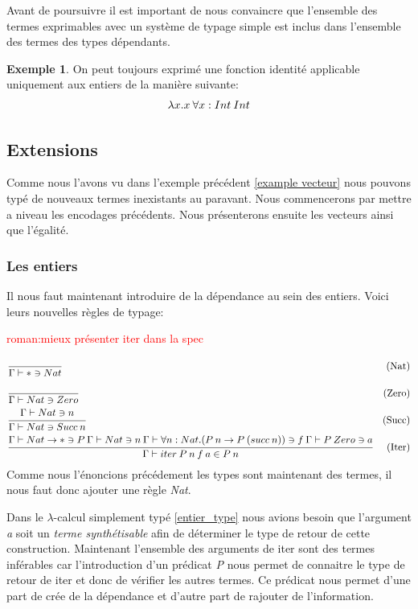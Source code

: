 \documentclass {article}
\theoremstyle{definition}
\newtheorem{example}{Exemple}
\theoremstyle{remark}
\newcommand{\todo}[1]{\textcolor{red}{#1}}
\begin{document}
Avant de poursuivre il est important de nous convaincre que l'ensemble des termes exprimables avec un système 
de typage simple est inclus dans l'ensemble des termes des types dépendants.
\begin{example}
  On peut toujours exprimé une fonction identité applicable uniquement aux entiers de la manière suivante:
  \begin{align*}
    &\lambda x. x\:\forall x:Int\:Int \\
  \end{align*}
\end{example}

\subsection{Extensions}

Comme nous l'avons vu dans l'exemple précédent \ref{example vecteur} nous pouvons typé de nouveaux termes inexistants au paravant.
Nous commencerons par mettre a niveau les encodages précédents. Nous présenterons ensuite les vecteurs ainsi que l'égalité.

\subsubsection{Les entiers}

Il nous faut maintenant introduire de la dépendance au sein des entiers. 
Voici leurs nouvelles règles de typage:

\todo{roman:mieux présenter iter dans la spec} 
\begin{align*}
  &\cfrac{}
  {\Gamma\vdash * \ni Nat}&\mbox{(Nat)} \\
  &\cfrac{}
  {\Gamma\vdash Nat \ni Zero}&\mbox{(Zero)} \\
  &\cfrac{\Gamma\vdash Nat \ni n}
  {\Gamma\vdash Nat \ni Succ\:n}&\mbox{(Succ)} \\
  &\cfrac{\Gamma\vdash Nat\rightarrow *\ni P\: \Gamma\vdash Nat\ni n\: \Gamma\vdash \forall n:Nat.(P\:n\rightarrow P\:(succ\:n))\ni f\:
  \Gamma\vdash P\:Zero\ni a}
  {\Gamma\vdash iter \: P\: n\:f\:a\in P\:n}&\mbox{(Iter)}\\
\end{align*}
Comme nous l'énoncions précédement les types sont maintenant des termes, il nous faut donc ajouter une règle \emph{Nat}.

Dans le $\lambda$-calcul simplement typé \ref{entier_type} nous avions besoin que l'argument \emph{a} soit un \emph{terme synthétisable}
afin de déterminer le type de retour de cette construction.
Maintenant l'ensemble des arguments de iter sont des termes inférables car l'introduction d'un prédicat
\emph{P} nous permet de connaitre le type de retour de iter et donc de vérifier les autres termes. 
Ce prédicat nous permet d'une part de crée de la dépendance et d'autre part de rajouter de l'information.
\end{document}

